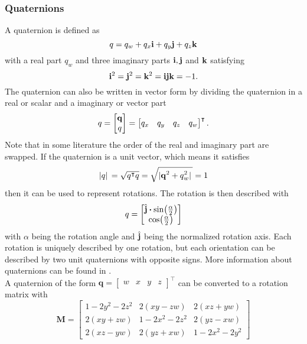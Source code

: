 \subsubsection{Quaternions}
A quaternion is defined as
\begin{equation}
	q = q_w + q_x\vb{i} + q_y\vb{j} + q_z\vb{k}
\end{equation}
with a real part $q_w$ and three imaginary parts $\vb{i}, \vb{j}$ and $\vb{k}$ satisfying
\begin{equation}
	\vb{i}^2 = \vb{j}^2 = \vb{k}^2 = \vb{i}\vb{j}\vb{k} = -1.
\end{equation}
The quaternion can also be written in vector form by dividing the quaternion in a real or scalar and a imaginary or vector part
\begin{equation}
	q = \begin{bmatrix}
		\vb{q} \\
		q
	\end{bmatrix}
	=\begin{bmatrix}
		q_x & q_y & q_z & q_w
	\end{bmatrix}^\intercal.
\end{equation}
Note that in some literature the order of the real and imaginary part are swapped.
If the quaternion is a unit vector, which means it satisfies
\begin{equation}
	\abs*{q} = \sqrt{q^\intercal q} = \sqrt{\abs*{\vb{q}^2 + q_w^2}} = 1
\end{equation}
then it can be used to represent rotations.
The rotation is then described with
\begin{equation}
	q =
	\begin{bmatrix}
		\hat{\vb{j}}\vdot\sin(\frac{\alpha}{2}) \\
		\cos(\frac{\alpha}{2})
	\end{bmatrix}
\end{equation}
with $\alpha$ being the rotation angle and $\hat{\vb{j}}$ being the normalized rotation axis.
Each rotation is uniquely described by one rotation, but each orientation can be described by two unit quaternions with opposite signs.
More information about quaternions can be found in \cite{Lefferts1982}.\\
A quaternion of the form
$\mathbf{q} = \left[\begin{array}{llll} w & x & y & z \end{array}\right]^{\intercal}$
can be converted to a rotation matrix with
\begin{equation}
	\mathbf{M} =
	\left[
		\begin{array}{ccc}
			1-2 y^{2}-2 z^{2} & 2(x y-z w)        & 2(x z+y w)        \\
			2(x y+z w)        & 1-2 x^{2}-2 z^{2} & 2(y z-x w)        \\
			2(x z-y w)        & 2(y z+x w)        & 1-2 x^{2}-2 y^{2}
		\end{array}
		\right]
\end{equation}

